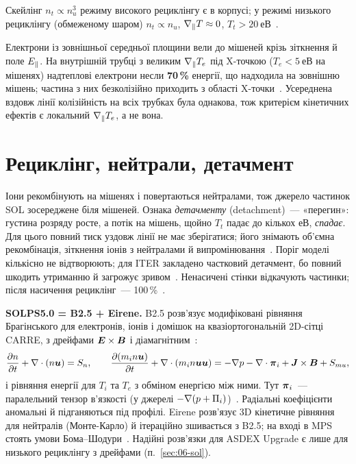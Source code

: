 Скейлінг $n_t\propto n_u^3$ режиму високого рециклінгу є в корпусі; у режимі низького рециклінгу (обмеженому шаром) $n_t\propto n_u$, $\nabla_\parallel T\approx0$, $T_t>\SI{20}{еВ}$~\cite[с.~28]{AhoMantila2011}.

\begin{corpusexample}
Електрони із зовнішньої середньої площини вели до мішеней крізь зіткнення й поле $E_{\parallel}$. На внутрішній трубці з великим $\nabla_\parallel T_e$ під X-точкою ($T_e<\SI{5}{еВ}$ на мішенях) надтеплові електрони несли \textbf{70\,\%} енергії, що надходила на зовнішню мішень; частина з них безколізійно приходить з області X-точки~\cite[с.~58]{AhoMantila2011}. Усереднена вздовж лінії колізійність на всіх трубках була однакова, тож критерієм кінетичних ефектів є локальний $\nabla_\parallel T_e$, а не вона.
\end{corpusexample}

\section{Рециклінг, нейтрали, детачмент}\label{sec:08-recycling}

Іони рекомбінують на мішенях і повертаються нейтралами, тож джерело частинок SOL зосереджене біля мішеней. Ознака \emph{детачменту} (detachment)~--- «перегин»: густина розряду росте, а потік на мішень, щойно $T_t$ падає до кількох еВ, \emph{спадає}. Для цього повний тиск уздовж лінії не має зберігатися; його знімають об'ємна рекомбінація, зіткнення іонів з нейтралами й випромінювання~\cite[с.~29]{AhoMantila2011}. Поріг моделі кількісно не відтворюють; для ITER закладено частковий детачмент, бо повний шкодить утриманню й загрожує зривом~\cite[с.~29]{AhoMantila2011}. Ненасичені стінки відкачують частинки; після насичення рециклінг~--- 100\,\%~\cite[с.~27--28]{AhoMantila2011}.

\textbf{SOLPS5.0 = B2.5 + Eirene.} B2.5 розв'язує модифіковані рівняння Брагінського для електронів, іонів і домішок на квазіортогональній 2D-сітці CARRE, з дрейфами $\bm{E}\times\bm{B}$ і діамагнітним~\cite[с.~48--51]{AhoMantila2011}:
\begin{equation}\label{eq:08-b25}
  \frac{\partial n}{\partial t}+\nabla\cdot(n\bm{u})=S_n,\qquad
  \frac{\partial(m_in\bm{u})}{\partial t}+\nabla\cdot(m_in\bm{u}\bm{u})=-\nabla p-\nabla\cdot\bm{\mathsf{\pi}}_i+\bm{J}\times\bm{B}+S_{mu},
\end{equation}
і рівняння енергії для $T_i$ та $T_e$ з обміном енергією між ними. Тут $\bm{\mathsf{\pi}}_i$~--- паралельний тензор в'язкості (у джерелі $-\nabla(p+\Pi_i)$)~\cite[с.~48--49, (4.2)--(4.5)]{AhoMantila2011}. Радіальні коефіцієнти аномальні й підганяються під профілі. Eirene розв'язує 3D кінетичне рівняння для нейтралів (Монте-Карло) й ітераційно зшивається з B2.5; на вході в MPS стоять умови Бома--Шодури~\cite[с.~50--51]{AhoMantila2011}. Надійні розв'язки для ASDEX Upgrade є лише для низького рециклінгу з дрейфами (п.~\ref{sec:06-sol}).

